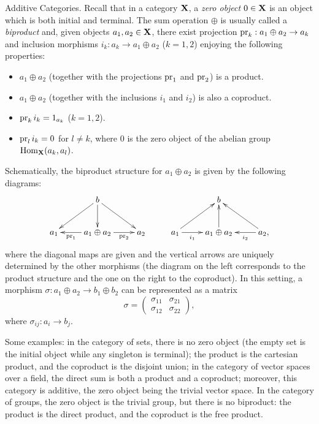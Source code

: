 {\sc Additive Categories.} Recall that in a category ${\bf X}$, a
\emph{zero object} $0\in {\bf X}$ is an object which is both initial
and terminal. The sum operation $\oplus$ is usually called a
\emph{biproduct} and, given objects $a_1,a_2\in {\bf X}$, there exist
projection $\operatorname{pr}_k:a_1\oplus a_2\to a_k$ and inclusion morphisms
$i_k:a_k\to a_1\oplus a_2$ ($k=1,2$) enjoying the following
properties:
\begin{itemize}
\item $a_1\oplus a_2$ (together with the projections $\operatorname{pr}_1$ and
  $\operatorname{pr}_2$) is a product.
\item $a_1\oplus a_2$ (together with the inclusions $i_1$ and $i_2$)
  is also a coproduct.
\item $\operatorname{pr}_ki_k=1_{a_k}$ ($k=1,2$).
\item $\operatorname{pr}_li_k=0$ for $l\neq k$, where $0$ is the zero object of the
  abelian group $\operatorname{Hom}_{\bf X}(a_k,a_l)$.
\end{itemize}
Schematically, the biproduct structure for $a_1\oplus a_2$ is given by
the following diagrams:
\begin{equation}\label{biproduct}
  \xymatrix{ & b \ar[dr] \ar[dl] \ar[d] &  & & b & \\
    a_1 & a_1\oplus a_2 \ar[l]^-{\pr_1} \ar[r]_-{\pr_2} & a_2 & a_1 \ar[r]_-{i_1} \ar[ur] & a_1\oplus a_2 \ar[u] & a_2 ,\ar[l]^-{i_2} \ar[lu]}
\end{equation}
where the diagonal maps are given and the vertical arrows are uniquely
determined by the other morphisms (the diagram on the left corresponds
to the product structure and the one on the right to the
coproduct). In this setting, a morphism $\sigma :a_1\oplus a_2\to
b_1\oplus b_2$ can be represented as a matrix
$$\sigma =\left (\begin{smallmatrix} \sigma_{11} & \sigma_{21} \\ \sigma_{12} & \sigma_{22} \end{smallmatrix} \right ),$$
where $\sigma_{ij}:a_i\to b_j$.

Some examples: in the category of sets, there is no zero object (the
empty set is the initial object while any singleton is terminal); the
product is the cartesian product, and the coproduct is the disjoint
union; in the category of vector spaces over a field, the direct sum
is both a product and a coproduct; moreover, this category is
additive, the zero object being the trivial vector space. In the
category of groups, the zero object is the trivial group, but there is
no biproduct: the product is the direct product, and the coproduct is
the free product.

